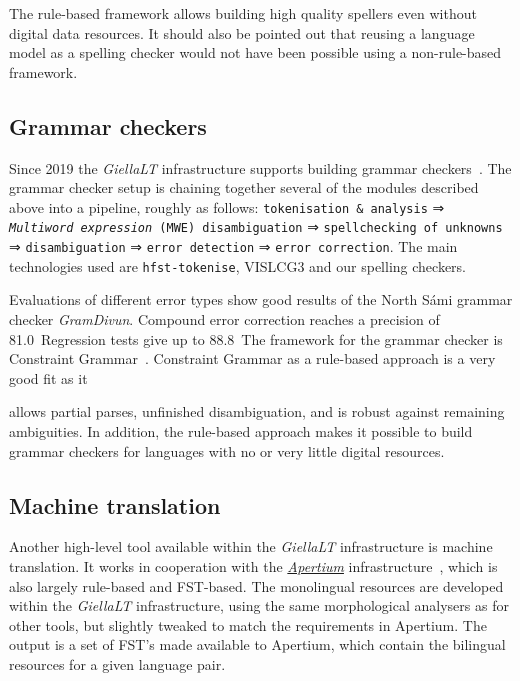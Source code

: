 \documentclass[free]{flammie}
\begin{document}
The rule-based framework allows building high quality spellers even without
digital data resources. It should also be pointed out that reusing a language
model as a spelling checker would not have been possible using a non-rule-based
framework.



\subsection{Grammar checkers}

Since 2019 the \textit{GiellaLT} infrastructure supports building grammar
checkers~\cite{Wiechetek2019many}.  The grammar checker setup is chaining together
several of the modules described above into a pipeline, roughly as follows:
\texttt{tokenisation \& analysis} ⇒ \texttt{\textit{Multiword expression} (MWE)
disambiguation} ⇒ \texttt{spellchecking of unknowns} ⇒ \texttt{disambiguation} ⇒
\texttt{error detection} ⇒ \texttt{error correction}. The main technologies used
are \texttt{hfst-tokenise}, VISLCG3 and our spelling checkers.

Evaluations of different error types show good results of the North Sámi grammar
checker \textit{GramDivun}. Compound error correction reaches a precision of
81.0\ Regression tests give up to 88.8\ The framework for the grammar checker is
Constraint Grammar~\cite{karlsson1990constraint,Didriksen2016constraint}.
Constraint Grammar as a rule-based approach is a very good fit as it

allows partial parses, unfinished disambiguation, and is robust against
remaining ambiguities. In addition, the rule-based approach makes it possible to
build grammar checkers for languages with no or very little digital resources.

\subsection{Machine translation}

Another high-level tool available within the \textit{GiellaLT} infrastructure is
machine translation. It works in cooperation with the
\textit{\href{https://github.com/apertium}{Apertium}}
infrastructure~\cite{khanna2021recent}, which is also largely rule-based and
FST-based. The monolingual resources are developed within the \textit{GiellaLT}
infrastructure, using the same morphological analysers as for other tools, but
slightly tweaked to match the requirements in Apertium. The output is a set of
FST's made available to Apertium, which contain the bilingual resources for a
given language pair.
\end{document}
